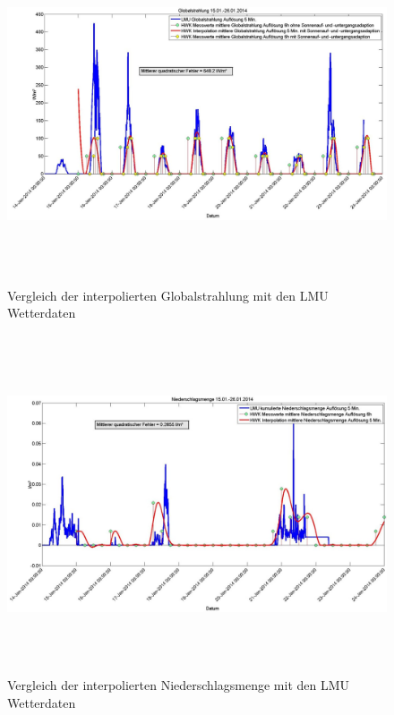 \begin{figure}
\centering
\includegraphics[width=16cm,height=10cm]{analyse/globalstr2}
\caption{Vergleich der interpolierten Globalstrahlung mit den LMU Wetterdaten}
\label{fig:globalstr}
\end{figure}
\begin{figure}
\centering
\includegraphics[width=16cm,height=10cm]{analyse/niedersmenge2}
\caption{Vergleich der interpolierten Niederschlagsmenge mit den LMU Wetterdaten}
\label{fig:niedersmenge}
\end{figure}
